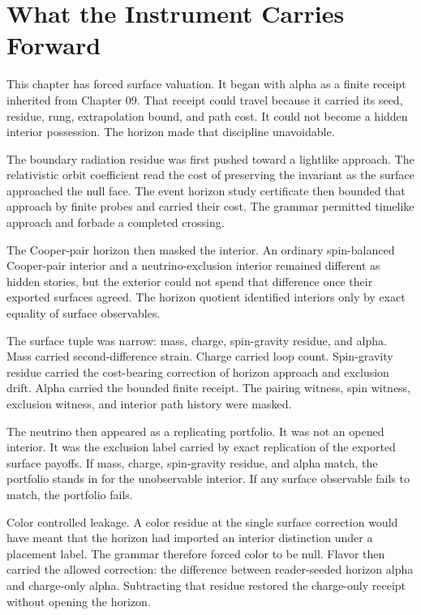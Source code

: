 \section{What the Instrument Carries Forward}

This chapter has forced surface valuation. It began with alpha as a finite
receipt inherited from Chapter 09. That receipt could travel because it
carried its seed, residue, rung, extrapolation bound, and path cost. It
could not become a hidden interior possession. The horizon made that
discipline unavoidable.

The boundary radiation residue was first pushed toward a lightlike
approach. The relativistic orbit coefficient read the cost of preserving the
invariant as the surface approached the null face. The event horizon study
certificate then bounded that approach by finite probes and carried their
cost. The grammar permitted timelike approach and forbade a completed
crossing.

The Cooper-pair horizon then masked the interior. An ordinary spin-balanced
Cooper-pair interior and a neutrino-exclusion interior remained different
as hidden stories, but the exterior could not spend that difference once
their exported surfaces agreed. The horizon quotient identified interiors
only by exact equality of surface observables.

The surface tuple was narrow: mass, charge, spin-gravity residue, and alpha.
Mass carried second-difference strain. Charge carried loop count.
Spin-gravity residue carried the cost-bearing correction of horizon
approach and exclusion drift. Alpha carried the bounded finite receipt. The
pairing witness, spin witness, exclusion witness, and interior path history
were masked.

The neutrino then appeared as a replicating portfolio. It was not an opened
interior. It was the exclusion label carried by exact replication of the
exported surface payoffs. If mass, charge, spin-gravity residue, and alpha
match, the portfolio stands in for the unobservable interior. If any surface
observable fails to match, the portfolio fails.

Color controlled leakage. A color residue at the single surface correction
would have meant that the horizon had imported an interior distinction under
a placement label. The grammar therefore forced color to be null. Flavor
then carried the allowed correction: the difference between reader-seeded
horizon alpha and charge-only alpha. Subtracting that residue restored the
charge-only receipt without opening the horizon.

